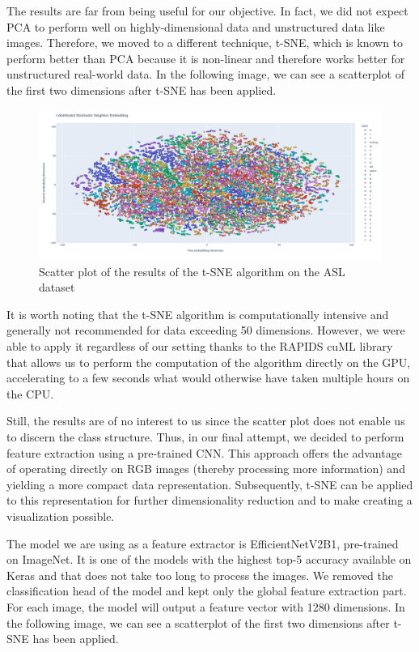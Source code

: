 \documentclass{Configuration_Files/PoliMi3i_thesis}
\begin{document}
The results are far from being useful for our objective. In fact, we did not expect PCA to perform well on highly-dimensional data and unstructured data like images. Therefore, we moved to a different technique, t-SNE, which is known to perform better than PCA because it is non-linear and therefore works better for unstructured real-world data. In the following image, we can see a scatterplot of the first two dimensions after t-SNE has been applied. 

\begin{figure}[H]
    \centering
    \includegraphics[width=\textwidth]{Figures/eda/tsne.png}
    \caption{Scatter plot of the results of the t-SNE algorithm on the ASL dataset}
    \label{fig:tsne}
\end{figure}

It is worth noting that the t-SNE algorithm is computationally intensive and generally not recommended for data exceeding 50 dimensions. However, we were able to apply it regardless of our setting thanks to the RAPIDS cuML library \cite{cuml} that allows us to perform the computation of the algorithm directly on the GPU, accelerating to a few seconds what would otherwise have taken multiple hours on the CPU.

Still, the results are of no interest to us since the scatter plot does not enable us to discern the class structure. Thus, in our final attempt, we decided to perform feature extraction using a pre-trained CNN.  This approach offers the advantage of operating directly on RGB images (thereby processing more information) and yielding a more compact data representation. Subsequently, t-SNE can be applied to this representation for further dimensionality reduction and to make creating a visualization possible.

The model we are using as a feature extractor is EfficientNetV2B1, pre-trained on ImageNet. It is one of the models with the highest top-5 accuracy available on Keras and that does not take too long to process the images. We removed the classification head of the model and kept only the global feature extraction part. For each image, the model will output a feature vector with 1280 dimensions. In the following image, we can see a scatterplot of the first two dimensions after t-SNE has been applied.
\end{document}
